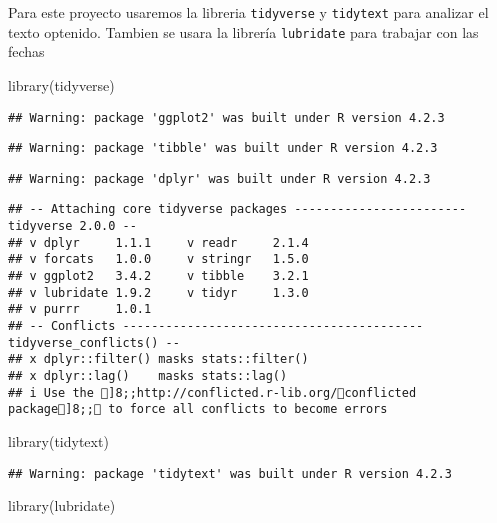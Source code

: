 \documentclass[
]{article}
\newenvironment{Shaded}{\begin{snugshade}}{\end{snugshade}}
\newcommand{\FunctionTok}[1]{\textcolor[rgb]{0.00,0.00,0.00}{#1}}
\newcommand{\NormalTok}[1]{#1}
\begin{document}
Para este proyecto usaremos la libreria \texttt{tidyverse} y
\texttt{tidytext} para analizar el texto optenido. Tambien se usara la
librería \texttt{lubridate} para trabajar con las fechas

\begin{Shaded}
\begin{Highlighting}[]
\FunctionTok{library}\NormalTok{(tidyverse)}
\end{Highlighting}
\end{Shaded}

\begin{verbatim}
## Warning: package 'ggplot2' was built under R version 4.2.3
\end{verbatim}

\begin{verbatim}
## Warning: package 'tibble' was built under R version 4.2.3
\end{verbatim}

\begin{verbatim}
## Warning: package 'dplyr' was built under R version 4.2.3
\end{verbatim}

\begin{verbatim}
## -- Attaching core tidyverse packages ------------------------ tidyverse 2.0.0 --
## v dplyr     1.1.1     v readr     2.1.4
## v forcats   1.0.0     v stringr   1.5.0
## v ggplot2   3.4.2     v tibble    3.2.1
## v lubridate 1.9.2     v tidyr     1.3.0
## v purrr     1.0.1     
## -- Conflicts ------------------------------------------ tidyverse_conflicts() --
## x dplyr::filter() masks stats::filter()
## x dplyr::lag()    masks stats::lag()
## i Use the ]8;;http://conflicted.r-lib.org/conflicted package]8;; to force all conflicts to become errors
\end{verbatim}

\begin{Shaded}
\begin{Highlighting}[]
\FunctionTok{library}\NormalTok{(tidytext)}
\end{Highlighting}
\end{Shaded}

\begin{verbatim}
## Warning: package 'tidytext' was built under R version 4.2.3
\end{verbatim}

\begin{Shaded}
\begin{Highlighting}[]
\FunctionTok{library}\NormalTok{(lubridate)}
\end{Highlighting}
\end{Shaded}
\end{document}

